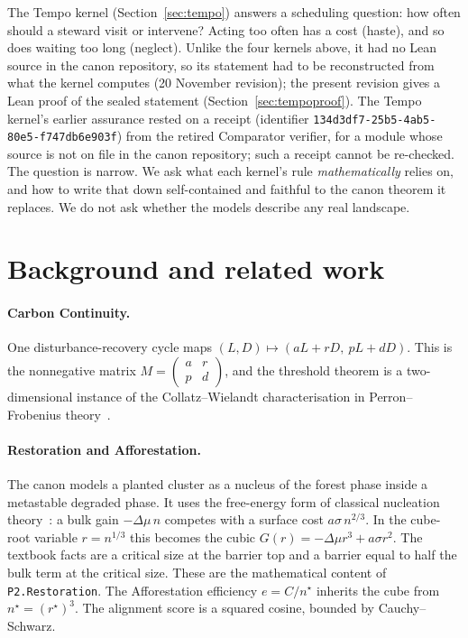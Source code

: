 \documentclass[11pt]{article}
\theoremstyle{definition}
\theoremstyle{remark}
\begin{document}
The Tempo kernel (Section~\ref{sec:tempo}) answers a scheduling question: how often should a steward visit or intervene?
Acting too often has a cost (haste), and so does waiting too long (neglect).
Unlike the four kernels above, it had no Lean source in the canon repository, so its statement had to be reconstructed from
what the kernel computes (20 November revision); the present revision gives a Lean proof of the sealed statement (Section~\ref{sec:tempoproof}).
The Tempo kernel's earlier assurance rested on a receipt (identifier \texttt{134d3df7-25b5-4ab5-80e5-f747db6e903f}) from the
retired Comparator verifier, for a module whose source is not on file in the canon repository; such a receipt cannot be re-checked.
The question is narrow. We ask what each kernel's rule \emph{mathematically} relies on, and how to write that down
self-contained and faithful to the canon theorem it replaces. We do not ask whether the models describe any real landscape.

\section{Background and related work}
\paragraph{Carbon Continuity.} One disturbance-recovery cycle maps $(L,D)\mapsto(aL+rD,\ pL+dD)$.
This is the nonnegative matrix $M=\begin{pmatrix}a&r\\p&d\end{pmatrix}$, and the threshold theorem is a
two-dimensional instance of the Collatz--Wielandt characterisation in Perron--Frobenius theory~\cite{BermanPlemmons1994}.

\paragraph{Restoration and Afforestation.} The canon models a planted cluster as a nucleus of the forest phase inside a
metastable degraded phase. It uses the free-energy form of classical nucleation theory~\cite{Kashchiev2000}:
a bulk gain $-\Delta\mu\, n$ competes with a surface cost $a\sigma\, n^{2/3}$.
In the cube-root variable $r=n^{1/3}$ this becomes the cubic $G(r)=-\Delta\mu r^3+a\sigma r^2$.
The textbook facts are a critical size at the barrier top and a barrier equal to half the bulk term at the critical size.
These are the mathematical content of \texttt{P2.Restoration}.
The Afforestation efficiency $e=C/n^\star$ inherits the cube from $n^\star=(r^\star)^3$.
The alignment score is a squared cosine, bounded by Cauchy--Schwarz.
\end{document}
